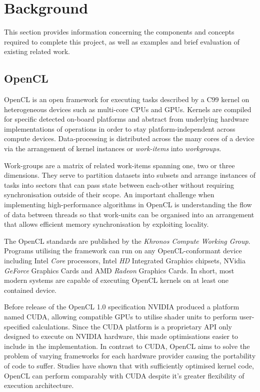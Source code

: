 \section{Background}
This section provides information concerning the components and concepts required to complete this project, as well as examples and brief evaluation of existing related work.
\subsection{OpenCL}
OpenCL is an open framework for executing tasks described by a C99 kernel on heterogeneous devices such as multi-core CPUs and GPUs. Kernels are compiled for specific detected on-board platforms and abstract from underlying hardware implementations of operations in order to stay platform-independent across compute devices. Data-processing is distributed across the many cores of a device via the arrangement of kernel instances or \emph{work-items} into \emph{workgroups}.

Work-groups are a matrix of related work-items spanning one, two or three dimensions. They serve to partition datasets into subsets and arrange instances of tasks into sectors that can pass state between each-other without requiring synchronisation outside of their scope. An important challenge when implementing high-performance algorithms in OpenCL is understanding the flow of data between threads so that work-units can be organised into an arrangement that allows efficient memory synchronisation by exploiting locality.

The OpenCL standards are published by the \emph{Khronos Compute Working Group}\cite{khronos}.
Programs utilising the framework can run on any OpenCL-conformant device including Intel \emph{Core} processors, Intel \emph{HD} Integrated Graphics chipsets, NVidia \emph{GeForce} Graphics Cards and AMD \emph{Radeon} Graphics Cards.
In short, most modern systems are capable of executing OpenCL kernels on at least one contained device.

Before release of the OpenCL 1.0 specification NVIDIA produced a platform named \ac{CUDA}, allowing compatible GPUs to utilise shader units to perform user-specified calculations. Since the CUDA platform is a proprietary API only designed to execute on NVIDIA hardware, this made optimisations easier to include in the implementation. In contrast to CUDA, OpenCL aims to solve the problem of varying frameworks for each hardware provider causing the portability of code to suffer. Studies have shown that with sufficiently optimised kernel code, OpenCL can perform comparably with CUDA despite it's greater flexibility of execution architecture\cite{perf}.
